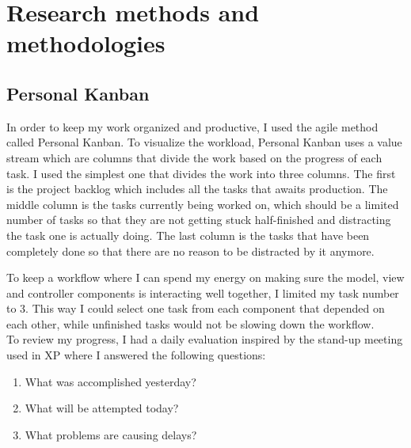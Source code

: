 
\chapter{Research methods and methodologies} %

\label{Chapter3} %


\section{Personal Kanban}
In order to keep my work organized and productive, I used the agile method called Personal Kanban. To visualize the workload, Personal Kanban uses a value stream which are columns that divide the work based on the progress of each task. I used the simplest one that divides the work into three columns. The first is the project backlog which includes all the tasks that awaits production. The middle column is the tasks currently being worked on, which should be a limited number of tasks so that they are not getting stuck half-finished and distracting the task one is actually doing. The last column is the tasks that have been completely done so that there are no reason to be distracted by it anymore. \parencite{Reference1}

To keep a workflow where I can spend my energy on making sure the model, view and controller components is interacting well together, I limited my task number to 3. This way I could select one task from each component that depended on each other, while unfinished tasks would not be slowing down the workflow.\\
To review my progress, I had a daily evaluation inspired by the stand-up meeting used in XP \parencite{Reference2} where I answered the following questions:
\begin{enumerate}
\item What was accomplished yesterday?
\item What will be attempted today?
\item What problems are causing delays?
\end{enumerate}




